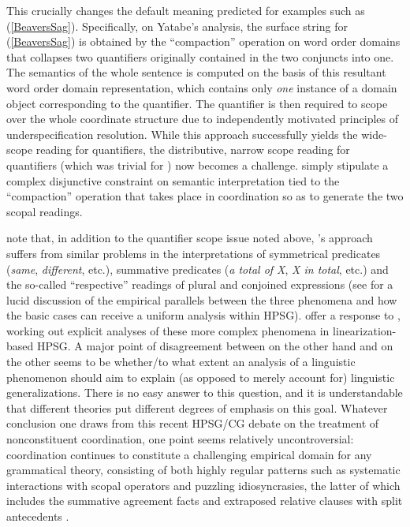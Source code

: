 \documentclass[output=paper,biblatex,babelshorthands,newtxmath,draftmode,colorlinks,citecolor=brown]{langscibook}
\begin{document}
This crucially changes the default meaning predicted for examples such
as (\ref{BeaversSag}). Specifically, on Yatabe's analysis, the surface
string for (\ref{BeaversSag}) is obtained by the ``compaction''
operation on word order domains that collapses two quantifiers
originally contained in the two conjuncts into one. The semantics of
the whole sentence is computed on the basis of this resultant word
order domain representation, which contains only \emph{one} instance
of a domain object corresponding to the quantifier. The quantifier is
then required to scope over the whole coordinate structure due to
independently motivated principles of underspecification resolution.
While this approach successfully yields the wide-scope reading for
quantifiers, the distributive, narrow scope reading for quantifiers
(which was trivial for \citeauthor{BS2004a}) now becomes a challenge.
\citeauthor{yatabe-tam2017} simply stipulate a complex disjunctive constraint on semantic
interpretation tied to the ``compaction'' operation that takes place in
coordination so as to generate the two scopal readings.

\citet[Section~3.2.2]{kubota-levine-coord} note that, in addition to the quantifier
scope issue noted above, \citeauthor{BS2004a}'s approach suffers from similar problems
in the interpretations of symmetrical predicates (\textit{same},
\textit{different}, etc.), summative predicates (\textit{a total of
X}, \textit{X in total}, etc.) and the so-called ``respective'' readings
of plural and conjoined expressions (see \citealt{chaves12} for a lucid
discussion of the empirical parallels between the three phenomena and
how the basic cases can receive a uniform analysis within HPSG).
\citet{yatabe-tam2017} offer a response to \citeauthor{kubota-levine-coord}, working out explicit
analyses of these more complex phenomena in linearization-based HPSG.
A major point of disagreement between \citeauthor{kubota-levine-coord} on the other
hand and \citeauthor{yatabe-tam2017} on the other seems to be
whether/to what extent an analysis of a linguistic phenomenon
should aim to explain (as opposed to merely account for)
linguistic generalizations. There is no easy answer to this
question, and it is understandable that different theories put
different degrees of emphasis on this goal.
Whatever conclusion one draws from this recent HPSG/CG debate on
the treatment of nonconstituent coordination, one point seems 
relatively uncontroversial: coordination continues to constitute a challenging
empirical domain for any grammatical theory,
consisting of both highly regular patterns such as systematic
interactions with scopal operators
\citep{kubota-levine-coord,KubotaLevineBook} and puzzling
idiosyncrasies, the latter of which includes the summative agreement
facts \citep{postalextraction,yatabe-tam2017} and extraposed relative
clauses with split antecedents
\citep{PerlmutterRoss70,Link84a-u,Kiss2005a,yatabe-tam2017}.
\end{document}
